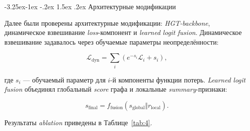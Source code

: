 \documentclass[a4paper,12pt]{extarticle}
\makeatletter
\renewcommand\subsubsection{\@startsection{subsubsection}{3}{\z@}%
  {-3.25ex\@plus -1ex \@minus -.2ex}%
  {1.5ex \@plus .2ex}%
  {\normalfont\normalsize\bfseries\Needspace{5\baselineskip}}}
\makeatother
\begin{document}
\subsubsection{Архитектурные модификации}

Далее были проверены архитектурные модификации: \textit{HGT-backbone}, динамическое взвешивание \textit{loss}-компонент и \textit{learned logit fusion}. Динамическое взвешивание задавалось через обучаемые параметры неопределённости:

\[
\mathcal{L}_{\mathrm{dyn}}=\sum_i\left(e^{-s_i}\mathcal{L}_i+s_i\right),
\]

где $s_i$ --- обучаемый параметр для $i$-й компоненты функции потерь. \textit{Learned logit fusion} объединял глобальный \textit{score} графа и локальные \textit{summary}-признаки:

\[
s_{\mathrm{final}}=f_{\mathrm{fusion}}\!\left(s_{\mathrm{global}}\Vert r_{\mathrm{local}}\right).
\]

Результаты \textit{ablation} приведены в Таблице~\ref{tab:4}.

\begin{table}[htbp]
\caption{\textit{Feature ablation}: \textit{dynamic weighting}, \textit{HGT} и \textit{learned logit fusion}}
\label{tab:4}
\centering
\scriptsize
{}
\end{table}
\end{document}
